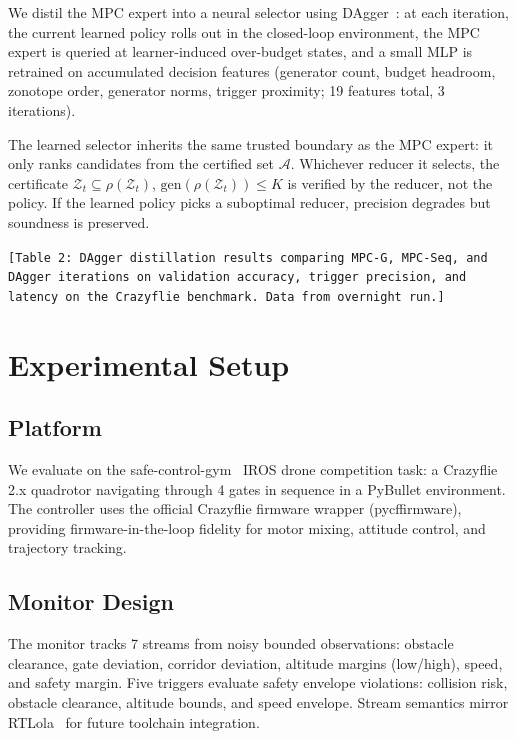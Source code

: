 \documentclass{article}
\newcommand{\Z}{\mathcal{Z}}
\newcommand{\placeholder}[1]{\texttt{[#1]}}
\begin{document}
We distil the MPC expert into a neural selector using DAgger~\cite{Ross2011}: at each iteration, the current learned policy rolls out in the closed-loop environment, the MPC expert is queried at learner-induced over-budget states, and a small MLP is retrained on accumulated decision features (generator count, budget headroom, zonotope order, generator norms, trigger proximity; 19 features total, 3 iterations).

The learned selector inherits the same trusted boundary as the MPC expert: it only ranks candidates from the certified set $\mathcal{A}$.
Whichever reducer it selects, the certificate $\Z_t \subseteq \rho(\Z_t)$, $\mathrm{gen}(\rho(\Z_t)) \leq K$ is verified by the reducer, not the policy.
If the learned policy picks a suboptimal reducer, precision degrades but soundness is preserved.

\placeholder{Table~2: DAgger distillation results comparing MPC-G, MPC-Seq, and DAgger iterations on validation accuracy, trigger precision, and latency on the Crazyflie benchmark. Data from overnight run.}


\section{Experimental Setup}\label{sec:setup}

\subsection{Platform}

We evaluate on the safe-control-gym~\cite{Panerati2021} IROS drone competition task: a Crazyflie 2.x quadrotor navigating through 4 gates in sequence in a PyBullet environment.
The controller uses the official Crazyflie firmware wrapper (pycffirmware), providing firmware-in-the-loop fidelity for motor mixing, attitude control, and trajectory tracking.

\subsection{Monitor Design}

The monitor tracks 7 streams from noisy bounded observations: obstacle clearance, gate deviation, corridor deviation, altitude margins (low/high), speed, and safety margin.
Five triggers evaluate safety envelope violations: collision risk, obstacle clearance, altitude bounds, and speed envelope.
Stream semantics mirror RTLola~\cite{RTLola2026} for future toolchain integration.
\end{document}
